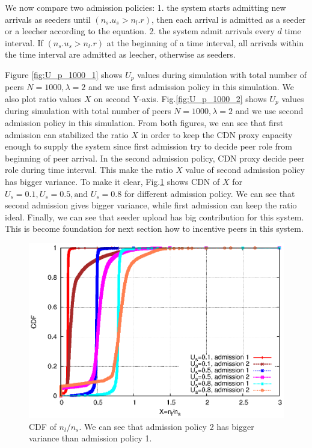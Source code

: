 \documentclass[paper]{ieice}
\begin{document}
We now compare two admission policies:
1. the system starts admitting new arrivals as seeders until $(n_s.u_s > n_l.r)$, then each arrival is admitted as a seeder or a leecher according to the equation.     
2. the system admit arrivals every $d$ time interval. If $(n_s.u_s > n_l.r)$ at the beginning of a time interval, all arrivals within the time interval are admitted as leecher, otherwise as seeders.

Figure \ref{fig:U_p_1000_1} shows $U_p$ values during simulation with total number of peers $N=1000, \lambda=2$ and we use first admission policy in this simulation. 
We also plot ratio values $X$ on second Y-axis.
Fig.\ref{fig:U_p_1000_2} shows $U_p$ values during simulation with total number of peers $N=1000, \lambda=2$ and we use second admission policy in this simulation.  
From both figures, we can see that first admission can stabilized the ratio $X$ in order to keep the CDN proxy capacity enough to supply the system since first admission try to decide peer role from beginning of peer arrival. 
In the second admission policy, CDN proxy decide peer role during time interval.
This make the ratio $X$ value of second admission policy has bigger variance.
To make it clear, Fig.\ref{fig:cdf} shows CDN of $X$ for $U_s=0.1, U_s=0.5, \text{and }  U_s=0.8$ for different admission policy. 
We can see that second admission gives bigger variance, while first admission can keep the ratio ideal.
Finally, we can see that seeder upload has big contribution for this system. 
This is become foundation for next section how to incentive peers in this system.

\begin{figure}[hb] 
\begin{center}
\includegraphics[scale=0.6]{graphs/cdf.eps}
\end{center}
\caption{CDF of $n_l/n_s$. We can see that admission policy 2 has bigger variance than admission policy 1.}
\label{fig:cdf}
\vspace{-2mm}
\end{figure}
 
\end{document}
